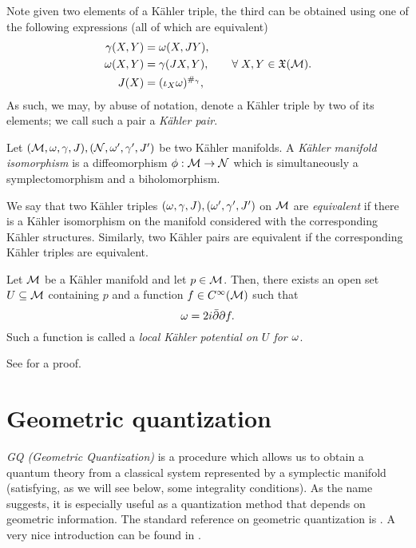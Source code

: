 \documentclass[notas.tex]{subfiles}
\begin{document}
Note given two elements of a Kähler triple, the third can be obtained using one of the following expressions (all of which are equivalent)
\begin{align} \label{eq_kahler_compatibility_conditions}
	\metric(X,Y) &= \sform(X,JY), \nonumber \\
	\sform(X,Y) &= \metric(JX,Y), \qquad \forall X,Y \in \vf(\mfld). \\
	\cstruct(X) &= (\contr{X}{\sform})^{\#_\gamma}, \nonumber
\end{align}
As such, we may, by abuse of notation, denote a Kähler triple by two of its elements; we call such a pair a \emph{Kähler pair}. %

\begin{defn}
	Let $(\mathcal{M}, \omega, \gamma, J), (\mathcal{N}, \omega', \gamma', J')$ be two Kähler manifolds. A \emph{Kähler manifold isomorphism} is a diffeomorphism $\phi: \mathcal{M} \to \mathcal{N}$ which is simultaneously a symplectomorphism and a biholomorphism.
\end{defn}

We say that two Kähler triples $(\omega, \gamma, J), (\omega', \gamma', J')$ on $\mathcal{M}$ are \emph{equivalent} if there is a Kähler isomorphism on the manifold considered with the corresponding Kähler structures. Similarly, two Kähler pairs are equivalent if the corresponding Kähler triples are equivalent.


\begin{thm}
Let $\mathcal{M}$ be a Kähler manifold and let $p \in \mathcal{M}$. Then, there exists an open set $U\subseteq \mathcal{M}$ containing $p$ and a function $f \in C^\infty(\mathcal{M})$ such that
\begin{equation*}
	\omega = 2 i \bar{\partial} \partial f.
\end{equation*}
Such a function is called a \emph{local Kähler potential on $U$ for $\omega$}.
\end{thm}
See \cite[Theorem 16.5]{cannas_da_silva_lectures_2001} for a proof.

\section{Geometric quantization} \label{sec_gq}

\emph{GQ (Geometric Quantization)} is a procedure which allows us to obtain a quantum theory from a classical system represented by a symplectic manifold (satisfying, as we will see below, some integrality conditions). As the name suggests, it is especially useful as a quantization method that depends on geometric information. The standard reference on geometric quantization is \cite{woodhouse_geometric_1992}. A very nice introduction can be found in \cite[Ch. 22, 23]{hall_quantum_2013}.
\end{document}
